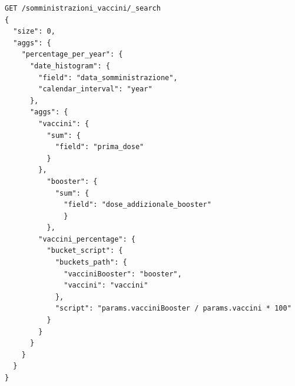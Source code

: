 \documentclass{article}
\begin{document}
\begin{enumerate}
\begin{lstlisting}
GET /somministrazioni_vaccini/_search
{ 
  "size": 0,
  "aggs": {
    "percentage_per_year": {
      "date_histogram": {
        "field": "data_somministrazione",
        "calendar_interval": "year"
      },
      "aggs": {
        "vaccini": {
          "sum": {
            "field": "prima_dose"
          }
        },
          "booster": {
            "sum": {
              "field": "dose_addizionale_booster"
              }
          },
        "vaccini_percentage": {
          "bucket_script": {
            "buckets_path": {
              "vacciniBooster": "booster",
              "vaccini": "vaccini"
            },
            "script": "params.vacciniBooster / params.vaccini * 100"
          }
        }
      }
    }
  }
}
\end{lstlisting}
\end{enumerate}
\end{document}
